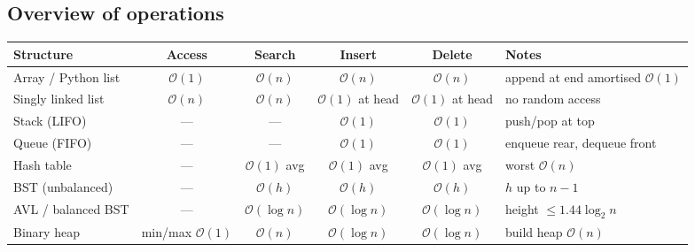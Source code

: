 \documentclass[11pt,a4paper]{article}
\newcommand{\Oh}{\mathcal{O}}
\begin{document}
\subsection{Overview of operations}
\begin{center}
\small
\begin{tabularx}{\textwidth}{>{\raggedright\arraybackslash}p{3.6cm} c c c c >{\raggedright\arraybackslash}X}
\toprule
\textbf{Structure} & \textbf{Access} & \textbf{Search} & \textbf{Insert} & \textbf{Delete} & \textbf{Notes}\\
\midrule
Array / Python list & $\Oh(1)$ & $\Oh(n)$ & $\Oh(n)$ & $\Oh(n)$ & append at end amortised $\Oh(1)$\\
Singly linked list & $\Oh(n)$ & $\Oh(n)$ & $\Oh(1)$ at head & $\Oh(1)$ at head & no random access\\
Stack (LIFO) & --- & --- & $\Oh(1)$ & $\Oh(1)$ & push/pop at top\\
Queue (FIFO) & --- & --- & $\Oh(1)$ & $\Oh(1)$ & enqueue rear, dequeue front\\
Hash table & --- & $\Oh(1)$ avg & $\Oh(1)$ avg & $\Oh(1)$ avg & worst $\Oh(n)$\\
BST (unbalanced) & --- & $\Oh(h)$ & $\Oh(h)$ & $\Oh(h)$ & $h$ up to $n-1$\\
AVL / balanced BST & --- & $\Oh(\log n)$ & $\Oh(\log n)$ & $\Oh(\log n)$ & height $\le1.44\log_2 n$\\
Binary heap & min/max $\Oh(1)$ & $\Oh(n)$ & $\Oh(\log n)$ & $\Oh(\log n)$ & build heap $\Oh(n)$\\
\bottomrule
\end{tabularx}
\end{center}
\end{document}
